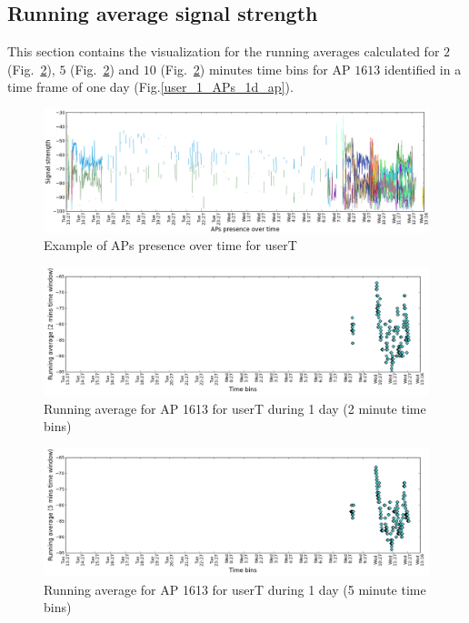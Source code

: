 \subsection{Running average signal strength}
\label{appendix_rn_avg}

This section contains the visualization for the running averages calculated for
$2$ (Fig.~\ref{user_1_AP1613_rn2avg_1d_A}), $5$
(Fig.~\ref{user_1_AP1613_rn2avg_1d_A}) and $10$
(Fig.~\ref{user_1_AP1613_rn2avg_1d_A}) minutes time bins for AP $1613$
identified in a time frame of one day (Fig.\ref{user_1_APs_1d_ap}).

\begin{figure}[!h]
\centering
\includegraphics[width
=\textwidth]{figures/rn_avg/user_1_sorted_1days_plot.png}
\caption{Example of APs presence over time for userT}
\label{user_1_APs_1d_ap_A}
\end{figure}

\begin{figure}[!h]
\centering
\includegraphics[width
=\textwidth]{figures/rn_avg/user_1_sorted_1days_plot_1613_rn_avg_sig_2.png}
\caption{Running average for AP 1613 for userT during 1 day (2 minute time
bins)}
\label{user_1_AP1613_rn2avg_1d_A}
\end{figure}

\begin{figure}[!h]
\centering
\includegraphics[width
=\textwidth]{figures/rn_avg/user_1_sorted_1days_plot_1613_rn_avg_sig_5.png}
\caption{Running average for AP 1613 for userT during 1 day (5 minute time
bins)}
\label{user_1_AP1613_rn5avg_1d_A}
\end{figure}

